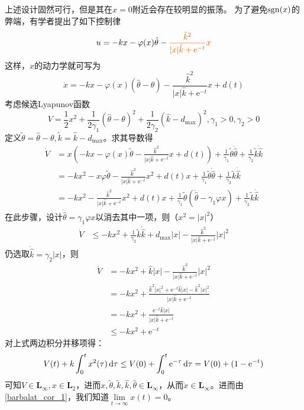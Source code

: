 上述设计固然可行，但是其在$x=0$附近会存在较明显的振荡。
为了避免$\operatorname{sgn}(x)$的弊端，有学者提出了如下控制律
\[u=-kx-\varphi(x)\hat{\theta}-\textcolor{second}{\frac{\hat{k}^2}{|x|\hat{k}+\mathrm{e}^{-t}}x}\]
这样，$x$的动力学就可写为
\[\dot{x}=-kx-\varphi(x)(\hat{\theta}-\theta)-\frac{\hat{k}^2}{|x|\hat{k}+\mathrm{e}^{-t}}x+d(t)\]
考虑候选Lyapunov函数
\[V=\frac{1}{2}x^2+\frac{1}{2\gamma_1}(\hat{\theta}-\theta)^2+\frac{1}{2\gamma_2}(\hat{k}-d_{\max})^2,\gamma_1>0,\gamma_2>0\]
定义$\tilde{\theta}=\hat{\theta}-\theta,\tilde{k}=\hat{k}-d_{\max}$。求其导数得
\begin{align*}
    \dot{V}&=x\left(-kx-\varphi(x)\tilde{\theta}-\frac{\hat{k}^2}{|x|\hat{k}+\mathrm{e}^{-t}}x+d(t)\right)+\frac{1}{\gamma_1}\tilde{\theta}\dot{\hat{\theta}}+\frac{1}{\gamma_2}\tilde{k}\dot{\hat{k}}\\
    &=-kx^2-x\varphi\tilde{\theta}-\frac{\hat{k}^2}{|x|\hat{k}+\mathrm{e}^{-t}}x^2+d(t)x+\frac{1}{\gamma_1}\tilde{\theta}\dot{\hat{\theta}}+\frac{1}{\gamma_2}\tilde{k}\dot{\hat{k}}\\
    &=-kx^2-\frac{\hat{k}^2}{|x|\hat{k}+\mathrm{e}^{-t}}x^2+d(t)x+\frac{1}{\gamma_1}\tilde{\theta}(\dot{\hat{\theta}}-\gamma_1\varphi x)+\frac{1}{\gamma_2}\tilde{k}\dot{\hat{k}}
\end{align*}
在此步骤，设计$\dot{\hat{\theta}}=\gamma_1\varphi x$以消去其中一项，则（$x^2=|x|^2$）
\begin{align*}
    \dot{V}&\leq -kx^2+\frac{1}{\gamma_2}\tilde{k}\dot{\hat{k}}+d_{\max}|x|-\frac{\hat{k}^2}{|x|\hat{k}+\mathrm{e}^{-t}}|x|^2
\end{align*}
仍选取$\dot{\hat{k}}=\gamma_2 |x|$，则
\begin{align*}
   \dot{V} &=-kx^2+{\hat{k}}|x|-\frac{\hat{k}^2}{|x|\hat{k}+\mathrm{e}^{-t}}|x|^2\\
    &=-kx^2+\frac{\hat{k}^2|x|^2+\mathrm{e}^{-t}\hat{k}|x|-\hat{k}^2|x|^2}{|x|\hat{k}+\mathrm{e}^{-t}}\\
    &=-kx^2+\frac{\mathrm{e}^{-t}\hat{k}|x|}{|x|\hat{k}+\mathrm{e}^{-t}}\\
    &\leq -kx^2+\mathrm{e}^{-t}
\end{align*}
对上式两边积分并移项得：
\[V(t)+k\int_{0}^{t} x^2(\tau)\mathop{}\!\mathrm{d}\tau\le V(0)+\int_{0}^{t} \mathrm{e}^{-\tau}\mathop{}\!\mathrm{d}\tau=V(0)+(1-\mathrm{e}^{-t})\]
可知$V\in\mathbf{L}_\infty,x\in\mathbf{L}_2$，进而$x,\tilde{\theta},\tilde{k},\hat{k},\hat{\theta}\in\mathbf{L}_\infty$，从而$\dot{x}\in\mathbf{L}_\infty$。进而由 \ref{barbalat_cor_1}，我们知道$\lim\limits_{t\to\infty}x(t)=0$。
